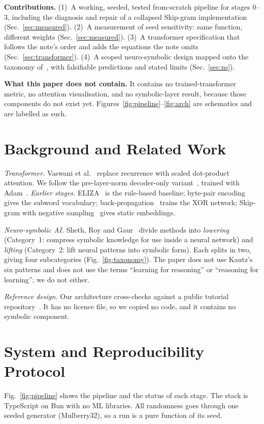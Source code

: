 \documentclass[conference]{IEEEtran}
\begin{document}
\textbf{Contributions.} (1)~A working, seeded, tested from-scratch pipeline for stages 0--3, including the diagnosis and repair of a collapsed Skip-gram implementation (Sec.~\ref{sec:measured}). (2)~A measurement of seed sensitivity: same function, different weights (Sec.~\ref{sec:measured}). (3)~A transformer specification that follows the note's order and adds the equations the note omits (Sec.~\ref{sec:transformer}). (4)~A scoped neuro-symbolic design mapped onto the taxonomy of~\cite{sheth2023}, with falsifiable predictions and stated limits (Sec.~\ref{sec:ns}).

\textbf{What this paper does not contain.} It contains no trained-transformer metric, no attention visualisation, and no symbolic-layer result, because those components do not exist yet. Figures~\ref{fig:pipeline}--\ref{fig:arch} are schematics and are labelled as such.

\section{Background and Related Work}
\emph{Transformer.} Vaswani et al.~\cite{vaswani2017} replace recurrence with scaled dot-product attention. We follow the pre-layer-norm decoder-only variant~\cite{ba2016}, trained with Adam~\cite{kingma2015}. \emph{Earlier stages.} ELIZA~\cite{weizenbaum1966} is the rule-based baseline; byte-pair encoding~\cite{sennrich2016} gives the subword vocabulary; back-propagation~\cite{rumelhart1986} trains the XOR network; Skip-gram with negative sampling~\cite{mikolov2013a,mikolov2013b} gives static embeddings.

\emph{Neuro-symbolic AI.} Sheth, Roy and Gaur~\cite{sheth2023} divide methods into \emph{lowering} (Category~1: compress symbolic knowledge for use inside a neural network) and \emph{lifting} (Category~2: lift neural patterns into symbolic form). Each splits in two, giving four subcategories (Fig.~\ref{fig:taxonomy}). The paper does not use Kautz's six patterns and does not use the terms ``learning for reasoning'' or ``reasoning for learning''; we do not either.

\emph{Reference design.} Our architecture cross-checks against a public tutorial repository~\cite{howllms}. It has no licence file, so we copied no code, and it contains no symbolic component.

\section{System and Reproducibility Protocol}
Fig.~\ref{fig:pipeline} shows the pipeline and the status of each stage. The stack is TypeScript on Bun with no ML libraries. All randomness goes through one seeded generator (Mulberry32), so a run is a pure function of its seed.
\end{document}
